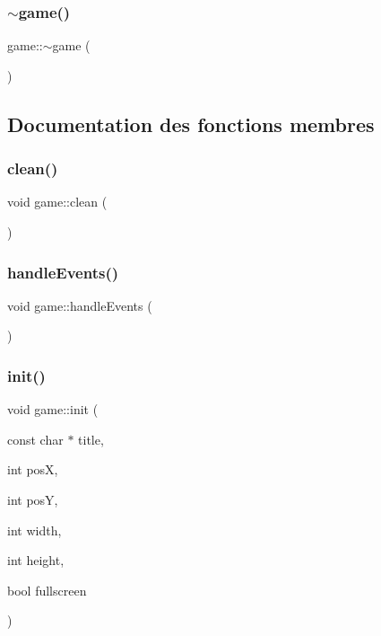 \mbox{\label{classgame_ae87abd20c4d8a7906fa48e690a5f1d07}} 
\subsubsection{\texorpdfstring{$\sim$game()}{~game()}}
{\footnotesize\ttfamily game\+::$\sim$game (\begin{DoxyParamCaption}{ }\end{DoxyParamCaption})}



\subsection{Documentation des fonctions membres}
\mbox{\label{classgame_a88b3caa9482e0223501490e19476bd0a}} 
\subsubsection{\texorpdfstring{clean()}{clean()}}
{\footnotesize\ttfamily void game\+::clean (\begin{DoxyParamCaption}{ }\end{DoxyParamCaption})}

\mbox{\label{classgame_a8fedf23a5fe4329f1f05758e26d58319}} 
\subsubsection{\texorpdfstring{handle\+Events()}{handleEvents()}}
{\footnotesize\ttfamily void game\+::handle\+Events (\begin{DoxyParamCaption}{ }\end{DoxyParamCaption})}

\mbox{\label{classgame_a10ab3c1529405984fa5406e2cf96c511}} 
\subsubsection{\texorpdfstring{init()}{init()}}
{\footnotesize\ttfamily void game\+::init (\begin{DoxyParamCaption}\item[{const char $\ast$}]{title,  }\item[{int}]{posX,  }\item[{int}]{posY,  }\item[{int}]{width,  }\item[{int}]{height,  }\item[{bool}]{fullscreen }\end{DoxyParamCaption})}

